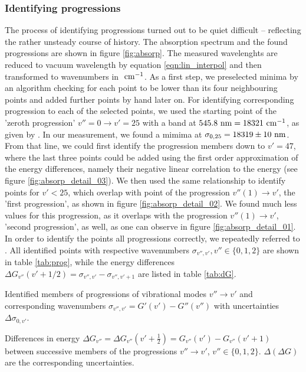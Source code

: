 \subsubsection{Identifying progressions}
The process of identifying progressions turned out to be quiet difficult – reflecting the 
rather unsteady course of history. 
The absorption spectrum and the found progressions are shown in figure \ref{fig:absorp}.
The measured wavelenghts are reduced to vacuum wavelength by equation \eqref{eqn:lin_interpol} 
and then transformed to wavenumbers in $\ \mathrm{cm^{-1}}$. 
As a first step, we preselected minima by an algorithm checking for each point to be lower than 
its four neighbouring points and added further points by hand later on. For identifying corresponding 
progression to each of the selected points, we used the starting point of the 'zeroth progression' 
$v'' = 0  \rightarrow v' = 25$ with a band at $545.8 \ \mathrm{nm} = 18321 \ \mathrm{cm^{-1}}$, as given by \cite{staatsexamen}. 
In our measurement, we found a mimima at $\sigma_{0, 25} = 18319 \pm 10\ \mathrm{nm}$. From that line, we could first 
identify the progression members down to $v' = 47$, where the last three points could be added using 
the first order approximation of the energy differences, namely their negative linear correlation 
to the energy (see figure \ref{fig:absorp_detail_03}). We then used the same relationship to identify 
points for $v' < 25$, which overlap with point of the progression $v''(1) \rightarrow v'$, the 
'first progression', as shown in figure \ref{fig:absorp_detail_02}. 
We found much less values for this progression, as 
it overlaps with the progression $v''(1) \rightarrow v'$, 'second progression', as well, 
as one can observe in figure \ref{fig:absorp_detail_01}. 
In order to identify the points all progressions correctly, we repeatedly 
referred to \cite{staatsexamen}. 
All identified points with respective wavenumbers 
$\sigma_{v'', v'}, v'' \in \{0, 1, 2\}$ are shown in table \ref{tab:prog}, 
while the energy differences $\Delta G_{v''}(v' + 1 / 2) = \sigma_{v'', v'} - \sigma_{v'', v' + 1}$ are 
listed in table \ref{tab:dG}.

\begin{table}[h]
\centering
\small

\caption{Identified members of progressions of vibrational modes $v'' \rightarrow v'$ 
and corresponding wavenumbers $\sigma_{v'', v'} = G'(v') - G''(v'')$ with uncertainties
$\Delta \sigma_{0, v'}$. }
\label{tab:prog}
\end{table}

\begin{table}[h]
\centering
\small

\caption{Differences in energy 
$\Delta G_{v''} = \Delta G_{v''} (v' + \frac{1}{2}) = G_{v''}(v') - G_{v''}(v' + 1)$ 
between successive members of the progressions $v'' \rightarrow v'$, $v'' \in \{0, 1, 2\}$. 
$ \Delta (\Delta G) $ are the corresponding uncertainties. 
 }
\label{tab:dG}
\end{table}

